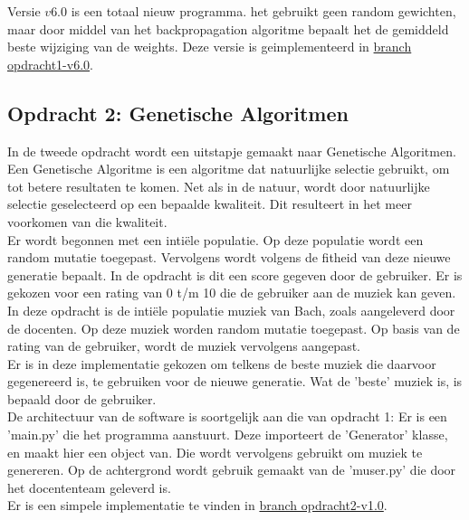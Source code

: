 \documentclass{article} %
\begin{document}
            Versie \(v6.0\) is een totaal nieuw programma. het gebruikt geen random gewichten, maar door middel van het backpropagation algoritme bepaalt het de gemiddeld beste wijziging van de weights. Deze versie is geimplementeerd in \href{https://github.com/tdregmans/TINLML02-persoonlijk-verslag/tree/opdracht1-v6.0/opdracht1}{branch opdracht1-v6.0}.
    
        \newpage

        \subsection{Opdracht 2: Genetische Algoritmen}
        
            In de tweede opdracht wordt een uitstapje gemaakt naar Genetische Algoritmen. Een Genetische Algoritme is een algoritme dat natuurlijke selectie gebruikt, om tot betere resultaten te komen. Net als in de natuur, wordt door natuurlijke selectie geselecteerd op een bepaalde kwaliteit. Dit resulteert in het meer voorkomen van die kwaliteit. \\
            Er wordt begonnen met een intiële populatie. Op deze populatie wordt een random mutatie toegepast. Vervolgens wordt volgens de fitheid van deze nieuwe generatie bepaalt. In de opdracht is dit een score gegeven door de gebruiker. Er is gekozen voor een rating van 0 t/m 10 die de gebruiker aan de muziek kan geven. \\
            In deze opdracht is de intiële populatie muziek van Bach, zoals aangeleverd door de docenten. Op deze muziek worden random mutatie toegepast. Op basis van de rating van de gebruiker, wordt de muziek vervolgens aangepast. \\
            Er is in deze implementatie gekozen om telkens de beste muziek die daarvoor gegenereerd is, te gebruiken voor de nieuwe generatie. Wat de 'beste' muziek is, is bepaald door de gebruiker. \\
            De architectuur van de software is soortgelijk aan die van opdracht 1: Er is een 'main.py' die het programma aanstuurt. Deze importeert de 'Generator' klasse, en maakt hier een object van. Die wordt vervolgens gebruikt om muziek te genereren. Op de achtergrond wordt gebruik gemaakt van de 'muser.py' die door het docententeam geleverd is. \\
            Er is een simpele implementatie te vinden in  \href{https://github.com/tdregmans/TINLML02-persoonlijk-verslag/tree/opdracht2-v1.0/opdracht2}{branch opdracht2-v1.0}.
    
\end{document}
